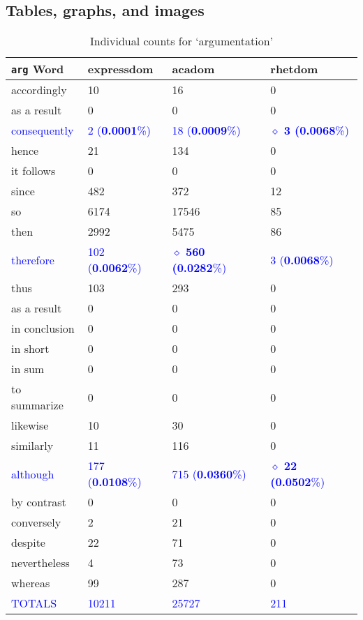 \documentclass{article}
\begin{document}
\subsection{Tables, graphs, and images}
\begin{table}[H]
\caption{Individual counts for `argumentation'}\label{arg-i-counts}
\begin{center}
\begin{tabular}{|l|l|l|l|}
    \hline
\textbf{\texttt{arg} Word} & \textbf{expressdom} &\textbf{acadom} & \textbf{rhetdom}\\
\hline \hline
accordingly & 10 & 16 & 0\\
\hline
as a result & 0 & 0 & 0\\  
\hline
\textcolor{blue}{consequently} & \textcolor{blue}{2 ({\bf 0.0001}\%)} & \textcolor{blue}{18 ({\bf 0.0009}\%)} & \textcolor{blue}{{\bf $\diamond$ 3 (0.0068}\%)}\\ 
\hline
hence & 21 & 134 & 0\\
\hline
it follows & 0 & 0 & 0\\
\hline
since & 482 & 372 & 12\\
\hline
so & 6174 & 17546 & 85 \\
\hline
then & 2992 & 5475 & 86\\
\hline
\textcolor{blue}{therefore} & \textcolor{blue}{102 ({\bf 0.0062}\%)} & \textcolor{blue}{{\bf $\diamond$ 560 (0.0282}\%)} & \textcolor{blue}{3 ({\bf 0.0068}\%)}\\
\hline
thus & 103 & 293 & 0\\
\hline
as a result & 0 & 0 & 0\\
\hline
in conclusion & 0 & 0 & 0\\
\hline
in short & 0 & 0 & 0\\
\hline
in sum & 0 & 0 & 0\\
\hline
to summarize & 0 & 0 & 0\\
\hline
likewise & 10 & 30 & 0\\
\hline
similarly & 11 & 116 & 0\\
\hline
\textcolor{blue}{although} & \textcolor{blue}{177 ({\bf 0.0108}\%)} & \textcolor{blue}{715 ({\bf 0.0360}\%)} & \textcolor{blue}{{\bf $\diamond$ 22 (0.0502}\%)}\\
\hline
by contrast & 0 & 0 & 0\\
\hline
conversely & 2 & 21 & 0\\
\hline
despite & 22 & 71 & 0\\
\hline
nevertheless & 4 & 73 & 0\\
\hline
whereas & 99 & 287 & 0\\
\hline \hline
\textcolor{blue}{TOTALS} & \textcolor{blue}{10211} & \textcolor{blue}{25727} & \textcolor{blue}{211} \\
   \hline
\end{tabular}
\end{center}
\end{table} 
\end{document}

